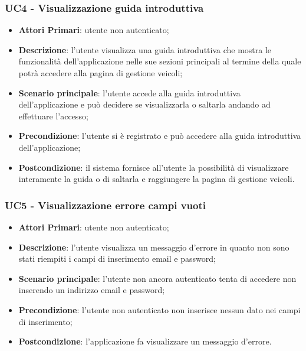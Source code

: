 \subsubsection{UC4 - Visualizzazione guida introduttiva}
\begin{itemize}
	\item \textbf{Attori Primari}: utente non autenticato;
	\item \textbf{Descrizione}: l'utente visualizza una guida introduttiva che mostra le funzionalità dell'applicazione nelle sue sezioni principali al termine della quale potrà accedere alla pagina di gestione veicoli;
	\item \textbf{Scenario principale}: l'utente accede alla guida introduttiva dell'applicazione e può decidere se visualizzarla o saltarla andando ad effettuare l'accesso;
	\item \textbf{Precondizione}: l'utente si è registrato e può accedere alla guida introduttiva dell'applicazione;
	\item \textbf{Postcondizione}: il sistema fornisce all'utente la possibilità di visualizzare interamente la guida o di saltarla e raggiungere la pagina di gestione veicoli.
\end{itemize}
\subsubsection{UC5 - Visualizzazione errore campi vuoti}
\begin{itemize}
	\item \textbf{Attori Primari}: utente non autenticato;
	\item \textbf{Descrizione}: l'utente visualizza un messaggio d'errore in quanto non sono stati riempiti i campi di inserimento email e password;
	\item \textbf{Scenario principale}: l'utente non ancora autenticato tenta di accedere non inserendo un indirizzo email e password;	
	\item \textbf{Precondizione}: l'utente non autenticato non inserisce nessun dato nei campi di inserimento;
	\item \textbf{Postcondizione}: l'applicazione fa visualizzare un messaggio d'errore.
\end{itemize}